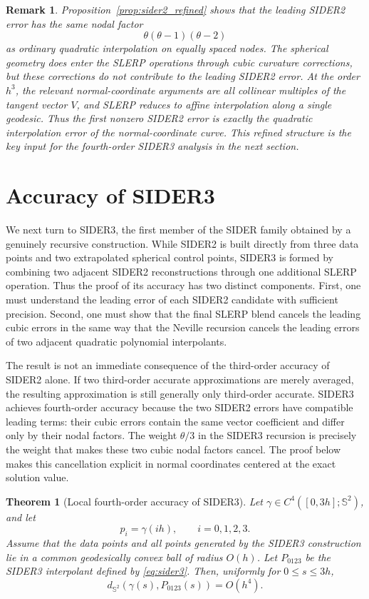 \documentclass[a4paper,11pt]{article}
\newcommand{\bS}{\mathbb{S}}
\newtheorem{thm}{Theorem}
\newtheorem{remark}{Remark}
\numberwithin{equation}{section}
\begin{document}
\begin{remark}
Proposition~\ref{prop:sider2_refined} shows that the leading SIDER2 error has
the same nodal factor
\[
        \theta(\theta-1)(\theta-2)
\]
as ordinary quadratic interpolation on equally spaced nodes.  The spherical
geometry does enter the SLERP operations through cubic curvature corrections,
but these corrections do not contribute to the leading SIDER2 error.  At the
order \(h^3\), the relevant normal-coordinate arguments are all collinear
multiples of the tangent vector \(V\), and SLERP reduces to affine interpolation
along a single geodesic.  Thus the first nonzero SIDER2 error is exactly the
quadratic interpolation error of the normal-coordinate curve.  This refined
structure is the key input for the fourth-order SIDER3 analysis in the next
section.
\end{remark}

\section{Accuracy of SIDER3}

We next turn to SIDER3, the first member of the SIDER family obtained by a
genuinely recursive construction.  While SIDER2 is built directly from three
data points and two extrapolated spherical control points, SIDER3 is formed by
combining two adjacent SIDER2 reconstructions through one additional SLERP
operation.  Thus the proof of its accuracy has two distinct components.  First,
one must understand the leading error of each SIDER2 candidate with sufficient
precision.  Second, one must show that the final SLERP blend cancels the
leading cubic errors in the same way that the Neville recursion cancels the
leading errors of two adjacent quadratic polynomial interpolants.

The result is not an immediate consequence of the third-order accuracy of
SIDER2 alone.  If two third-order accurate approximations are merely averaged,
the resulting approximation is still generally only third-order accurate.
SIDER3 achieves fourth-order accuracy because the two SIDER2 errors have
compatible leading terms: their cubic errors contain the same vector
coefficient and differ only by their nodal factors.  The weight \(\theta/3\)
in the SIDER3 recursion is precisely the weight that makes these two cubic
nodal factors cancel.  The proof below makes this cancellation explicit in
normal coordinates centered at the exact solution value.

\begin{thm}[Local fourth-order accuracy of SIDER3]
\label{thm:sider3}
Let \(\gamma\in C^4([0,3h];\bS^2)\), and let
\[
        p_i=\gamma(ih),\qquad i=0,1,2,3 .
\]
Assume that the data points and all points generated by the SIDER3
construction lie in a common geodesically convex ball of radius \(O(h)\).
Let \(P_{0123}\) be the SIDER3 interpolant defined by \eqref{eq:sider3}.
Then, uniformly for \(0\leq s\leq 3h\),
\[
        d_{\bS^2}\!\left(\gamma(s),P_{0123}(s)\right)
        =O(h^4).
\]
\end{thm}
\end{document}
